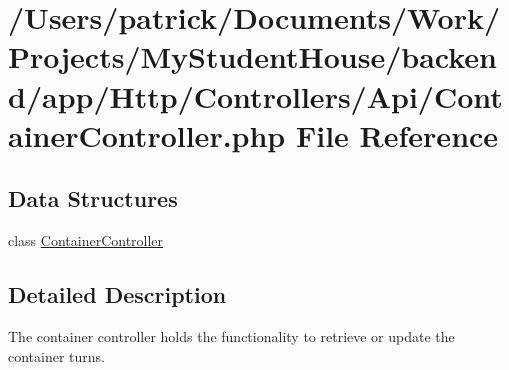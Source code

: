 \hypertarget{_container_controller_8php}{}\section{/\+Users/patrick/\+Documents/\+Work/\+Projects/\+My\+Student\+House/backend/app/\+Http/\+Controllers/\+Api/\+Container\+Controller.php File Reference}
\label{_container_controller_8php}
\subsection*{Data Structures}
\begin{DoxyCompactItemize}
\item 
class \mbox{\hyperlink{class_app_1_1_http_1_1_controllers_1_1_a_p_i_1_1_container_controller}{Container\+Controller}}
\end{DoxyCompactItemize}


\subsection{Detailed Description}
The container controller holds the functionality to retrieve or update the container turns. 
